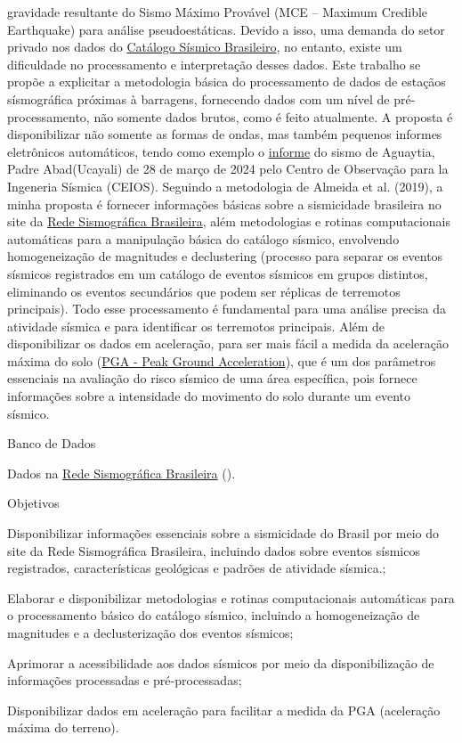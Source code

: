 \documentclass[10pt,a4paper,oneside]{book}
\begin{document}
gravidade resultante do Sismo Máximo Provável (MCE – Maximum Credible Earthquake) para análise pseudoestáticas. Devido a isso, uma demanda do setor privado nos dados do \href{https://moho.iag.usp.br/eq/bulletin/}{Catálogo Sísmico Brasileiro}, no entanto, existe um dificuldade no processamento e interpretação desses dados. Este trabalho se propõe a explicitar a metodologia básica do processamento de dados de estaçãos sísmográfica próximas à barragens, fornecendo dados com um nível de pré-processamento, não somente dados brutos, como é feito atualmente. A proposta é disponibilizar não somente as formas de ondas, mas também pequenos informes eletrônicos automáticos, tendo como exemplo o \href{https://www.cismid.uni.edu.pe/wp-content/uploads/2024/03/CISMID_20240328_110115_AGUAYTIA.pdf}{informe} do sismo de Aguaytia, Padre Abad(Ucayali) de 28 de março de 2024 pelo Centro de Observação para la Ingeneria Sísmica (CEIOS). Seguindo a metodologia de Almeida et al. (2019), a minha proposta é fornecer informações básicas sobre a sismicidade brasileira no site da \href{www.rsbr.on.br}{Rede Sismográfica Brasileira}, além metodologias e rotinas computacionais automáticas para a manipulação básica do catálogo sísmico, envolvendo homogeneização de magnitudes e declustering (processo para separar os eventos sísmicos registrados em um catálogo de eventos sísmicos em grupos distintos, eliminando os eventos secundários que podem ser réplicas de terremotos principais). Todo esse processamento é fundamental para uma análise precisa da atividade sísmica e para identificar os terremotos principais. Além de disponibilizar os dados em aceleração, para ser mais fácil a medida da aceleração máxima do solo (\href{https://en.wikipedia.org/wiki/Peak_ground_acceleration}{PGA - Peak Ground Acceleration}), que é um dos parâmetros essenciais na avaliação do risco sísmico de uma área específica, pois fornece informações sobre a intensidade do movimento do solo durante um evento sísmico.

\begin{fancyenum}{\faDatabase}{Banco de Dados}
	\item Dados na \href{http://rsbr.on.br/}{Rede Sismográfica Brasileira} (\faUnlock).
\end{fancyenum}

\begin{fancyenum}{\faFutbol}{Objetivos}
	\item Disponibilizar informações essenciais sobre a sismicidade do Brasil por meio do site da Rede Sismográfica Brasileira, incluindo dados sobre eventos sísmicos registrados, características geológicas e padrões de atividade sísmica.;
	\item Elaborar e disponibilizar metodologias e rotinas computacionais automáticas para o processamento básico do catálogo sísmico, incluindo a homogeneização de magnitudes e a declusterização dos eventos sísmicos;
	\item Aprimorar a acessibilidade aos dados sísmicos por meio da disponibilização de informações processadas e pré-processadas;
	\item Disponibilizar dados em aceleração para facilitar a medida da PGA (aceleração máxima do terreno).
\end{fancyenum}
\end{document}
